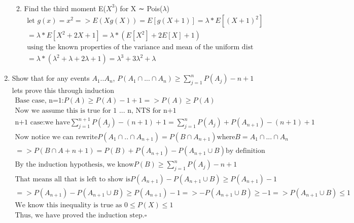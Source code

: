 \documentclass[11pt]{article}
\begin{document}
\begin{enumerate}
\begin{enumerate}
\begin{gather}
	\end{gather}
	\item Find the third moment E($X^3$) for X ∼ Pois($\lambda$)
	\begin{gather}
		\text{let }g(x) = x^2
		=> E(Xg(X))=E[g(X+1)]=\lambda * E[(X+1)^2]\\
		= \lambda * E[X^2 + 2X+1] = \lambda * (E[X^2] + 2E[X] + 1) \\
		\text{using the known properties of the variance and mean of the uniform dist we get}\\
		= \lambda * (\lambda^2 + \lambda + 2\lambda + 1) = \lambda^3 + 3\lambda^2 + \lambda
	\end{gather}
\end{enumerate}
\item Show that for any events $A_1..A_n$,
$P(A_1\cap...\cap A_n) \geq \sum_{j=1}^{n} P(A_j) - n +1$\\
lets prove this through induction
\begin{gather} 
	\text{Base case, n=1:} P(A) \geq P(A) - 1 + 1 => P(A) \geq P(A)\\
	\text{Now we assume this is true for 1 ... n, NTS for n+1}\\
	\text{n+1 case:} \text{we have} \sum_{j=1}^{n+1} P(A_j) -(n+1) +1 = \sum_{j=1}^{n} P(A_j) + P(A_{n+1}) - (n+1) + 1\\
	\text{Now notice we can rewrite} P(A_1 \cap .. \cap A_{n+1}) = P(B\cap A_{n+1}) \text{where} B=A_1\cap ... \cap A_n\\
	=> P(B \cap A+{n+1}) = P(B) + P(A_{n+1}) - P(A_{n+1} \cup B) \text{by definition}\\
	\text{By the induction hypothesis, we know} P(B) \geq \sum_{j=1}^{n} P(A_j) - n + 1\\
	\text{That means all that is left to show is} P(A_{n+1}) - P(A_{n+1} \cup B) \geq  P(A_{n+1}) - 1\\
	=>P(A_{n+1}) - P(A_{n+1} \cup B) \geq  P(A_{n+1}) - 1 => -P(A_{n+1} \cup B) \geq - 1 => P(A_{n+1} \cup B) \leq 1 \\
	\text{We know this inequality is true as } 0 \leq P(X) \leq 1\\
	\text{Thus, we have proved the induction step}. \square
\end{gather}


\end{enumerate}
\end{document}
